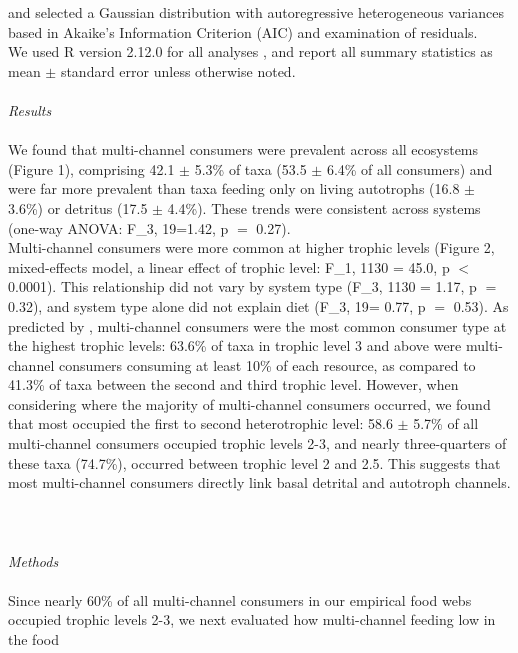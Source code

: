 \documentclass[12pt,a4paper,oneside]{article}
\begin{document}
\citep{Bolker:2009, Wolfinger:1996} 
and selected a Gaussian distribution with
autoregressive heterogeneous variances based in
Akaike's Information Criterion (AIC) and examination
of residuals. 
\\ 
\indent We used R version 2.12.0 for all
analyses \citep{Rcore:2010}, and report all summary statistics as mean ${\pm}$
standard error unless otherwise noted.
\\
\\
\emph{Results}\\
\\
\indent We found that multi-channel consumers were prevalent across all ecosystems
(Figure 1), comprising 42.1 ${\pm}$ 5.3\% of taxa (53.5 ${\pm}$ 6.4\%
of all consumers) and were far more
prevalent than taxa feeding only on living
autotrophs (16.8 ${\pm}$ 3.6\%) or detritus (17.5 ${\pm}$ 4.4\%). These
trends were consistent across systems (one-way ANOVA:
F_{3, 19}=1.42, p \(=\) 0.27).
\\
\indent Multi-channel consumers were more common at
higher trophic levels (Figure 2, mixed-effects model, a linear effect
of trophic level:
F_{1, 1130 }= 45.0, p \(<\) 0.0001). This relationship did not vary
by system type (F_{3, 1130 }= 1.17, p \(=\) 0.32), and system type
alone did not explain diet (F_{3, 19}=
0.77, p \(=\) 0.53). As predicted by \citet{Rooney:2006}, multi-channel consumers
were the most common consumer type at the highest trophic levels: 63.6\% of taxa
in trophic level 3 and above were multi-channel consumers consuming at
least 10\% of each resource, as compared to 41.3\% of taxa between the
second and third trophic level. However, when considering where the
majority of multi-channel consumers occurred, we found that most
occupied the first to second heterotrophic level: 58.6 ${\pm}$
5.7\% of all multi-channel consumers occupied trophic levels 2-3, and
nearly three-quarters of these taxa (74.7\%), occurred between trophic
level 2 and 2.5.
This suggests that most multi-channel consumers directly
link basal detrital and autotroph channels. 
\\
\\
\\
\\
\emph{Methods}\\
\\
\indent Since nearly 60\% of all multi-channel consumers in our
empirical food webs occupied
trophic levels 2-3, we next evaluated how multi-channel feeding low in the food
\end{document}
